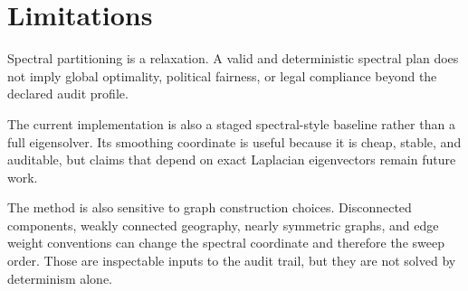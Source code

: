 \section{Limitations}

Spectral partitioning is a relaxation. A valid and deterministic spectral plan
does not imply global optimality, political fairness, or legal compliance beyond
the declared audit profile.

The current implementation is also a staged spectral-style baseline rather than
a full eigensolver. Its smoothing coordinate is useful because it is cheap,
stable, and auditable, but claims that depend on exact Laplacian eigenvectors
remain future work.

The method is also sensitive to graph construction choices. Disconnected
components, weakly connected geography, nearly symmetric graphs, and edge
weight conventions can change the spectral coordinate and therefore the sweep
order. Those are inspectable inputs to the audit trail, but they are not solved
by determinism alone.
